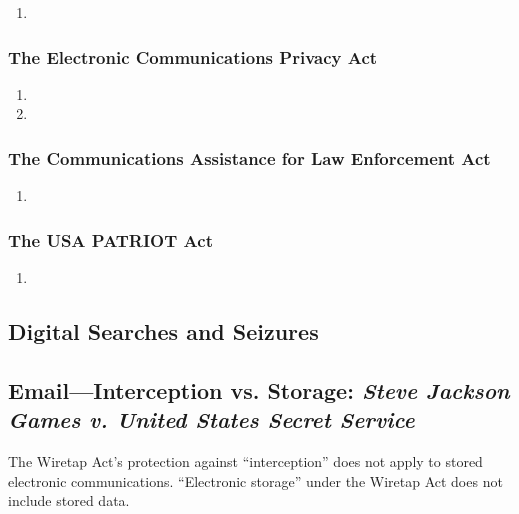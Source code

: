 \begin{enumerate}
    \item %
\end{enumerate}

\subsubsection{The Electronic Communications Privacy Act}

\begin{enumerate}
    \item %
    \item %
\end{enumerate}

\subsubsection{The Communications Assistance for Law Enforcement Act}

\begin{enumerate}
    \item %
\end{enumerate}

\subsubsection{The USA PATRIOT Act}

\begin{enumerate}
    \item %
\end{enumerate}

\subsection{Digital Searches and Seizures}

\subsection{Email---Interception vs. Storage: \emph{Steve Jackson Games v. 
United States Secret Service}}

The Wiretap Act's protection against ``interception'' does not apply to 
stored electronic communications. ``Electronic storage'' under the Wiretap Act 
does not include stored data.

